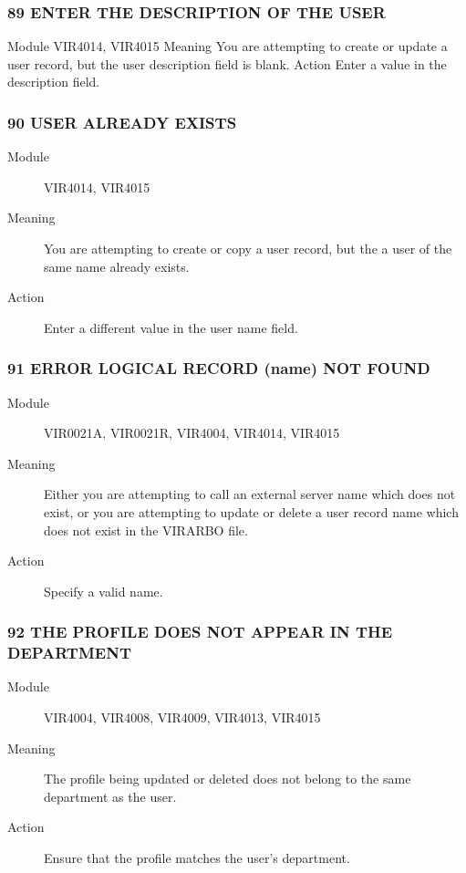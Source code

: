 \documentclass[letterpaper,10pt,english]{sphinxmanual}
\begin{document}
\subsubsection{89 ENTER THE DESCRIPTION OF THE USER}
\label{\detokenize{messages:enter-the-description-of-the-user}}
Module
VIR4014, VIR4015
Meaning
You are attempting to create or update a user record, but the user description field is blank.
Action
Enter a value in the description field.


\subsubsection{90 USER ALREADY EXISTS}
\label{\detokenize{messages:user-already-exists}}\begin{description}
\item[{Module}] \leavevmode
VIR4014, VIR4015

\item[{Meaning}] \leavevmode
You are attempting to create or copy a user record, but the a user of the same name already exists.

\item[{Action}] \leavevmode
Enter a different value in the user name field.

\end{description}


\subsubsection{91 ERROR LOGICAL RECORD (name) NOT FOUND}
\label{\detokenize{messages:error-logical-record-name-not-found}}\begin{description}
\item[{Module}] \leavevmode
VIR0021A, VIR0021R, VIR4004, VIR4014, VIR4015

\item[{Meaning}] \leavevmode
Either you are attempting to call an external server name which does not exist, or you are attempting to update or delete a user record name which does not exist in the VIRARBO file.

\item[{Action}] \leavevmode
Specify a valid name.

\end{description}


\subsubsection{92 THE PROFILE DOES NOT APPEAR IN THE DEPARTMENT}
\label{\detokenize{messages:the-profile-does-not-appear-in-the-department}}\begin{description}
\item[{Module}] \leavevmode
VIR4004, VIR4008, VIR4009, VIR4013, VIR4015

\item[{Meaning}] \leavevmode
The profile being updated or deleted does not belong to the same department as the user.

\item[{Action}] \leavevmode
Ensure that the profile matches the user’s department.

\end{description}
\end{document}
